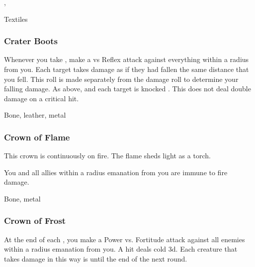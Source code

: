  , 


 Textiles


\lowercase{\hypertarget{item:Crater Boots}{}}\label{item:Crater Boots}
\hypertarget{item:Crater Boots}{\subsubsection{Crater Boots\hfill{}}}

Whenever you take , make a  vs Reflex attack against everything within a \areasmall radius from you.
\hit Each target takes damage as if they had fallen the same distance that you fell.
This roll is made separately from the damage roll to determine your falling damage.
\crit As above, and each target is knocked .
This does not deal double damage on a critical hit.



 Bone, leather, metal


\lowercase{\hypertarget{item:Crown of Flame}{}}\label{item:Crown of Flame}
\hypertarget{item:Crown of Flame}{\subsubsection{Crown of Flame\hfill{}}}

This crown is continuously on fire.
The flame sheds light as a torch.

You and all allies within a \arealarge radius emanation from you are immune to fire damage.



 


 Bone, metal


\lowercase{\hypertarget{item:Crown of Frost}{}}\label{item:Crown of Frost}
\hypertarget{item:Crown of Frost}{\subsubsection{Crown of Frost\hfill{}}}

At the end of each , you make a Power vs. Fortitude attack against all enemies within a \areamed radius emanation from you.
A hit deals cold  \minus3d.
Each creature that takes damage in this way is \fatigued until the end of the next round.



